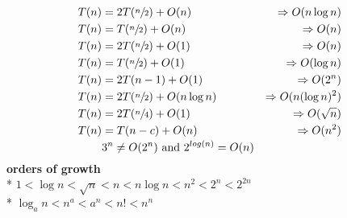 \documentclass[10pt]{article}
\newenvironment{tightcenter}{%
  \setlength\topsep{0pt}
  \setlength\parskip{0pt}
  \begin{center}
}{%
  \end{center}
}
\let\then\rightarrow
\begin{document}
\begin{multicols}{3}
\begin{tightcenter}
\begin{align*}
    T(n) &= 2T(\sfrac{n}{2}) + O(n) &\Rightarrow O(n \log n)
    \\ T(n) &= T(\sfrac{n}{2}) + O(n) &\Rightarrow O(n)
    \\ T(n) &= 2T(\sfrac{n}{2}) + O(1) &\Rightarrow O(n)
    \\ T(n) &= T(\sfrac{n}{2}) + O(1) &\Rightarrow O(\log n)
    \\ T(n) &= 2T(n - 1) + O(1) &\Rightarrow O(2^n)
    \\ T(n) &= 2T(\sfrac{n}{2}) + O(n \log n) &\Rightarrow O(n(\log n)^2)
    \\ T(n) &= 2T(\sfrac{n}{4}) + O(1) &\Rightarrow O(\sqrt{n})
    \\ T(n) &= T(n - c) + O(n) &\Rightarrow O(n^2)
    \\ & 3^n \neq O(2^n) \text{ and } 2^{log(n)} = O(n)
\end{align*}
\textbf{orders of growth}
\\* $1 < \log n < \sqrt{n} < n < n \log n < n^2 < 2^n < 2^{2n}$
\\* $\log_a n < n^a < a^n < n! < n^n$ 
\end{tightcenter}

\end{multicols}
\end{document}
